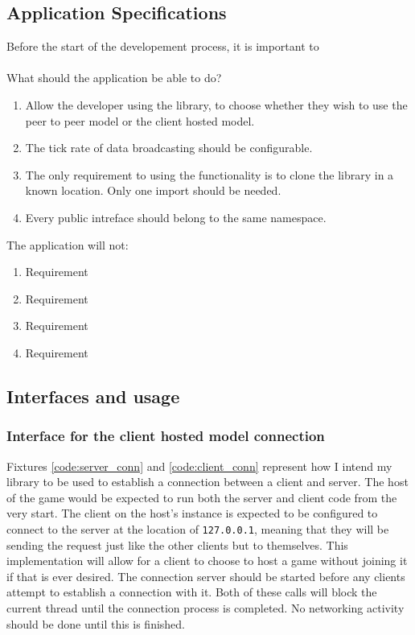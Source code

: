 \subsection{Application Specifications}
Before the start of the developement process, it is important to
\\
\\
What should the application be able to do?
\begin{enumerate}
\item Allow the developer using the library, to choose whether they wish to use the peer to peer model or the client hosted model.
\item The tick rate of data broadcasting should be configurable.
\item The only requirement to using the functionality is to clone the library in a known location. Only one import should be needed.
\item Every public intreface should belong to the same namespace.
\end{enumerate}
The application will not:
\begin{enumerate}
\item Requirement
\item Requirement
\item Requirement
\item Requirement
\end{enumerate}

\newpage
\subsection{Interfaces and usage}

\subsubsection{Interface for the client hosted model connection}
Fixtures \ref{code:server_conn} and \ref{code:client_conn} represent how I intend my library to be used to establish a connection between a client and server. The host of the game would be expected to run both the server and client code from the very start. The client on the host's instance is expected to be configured to connect to the server at the location of \lstinline{127.0.0.1}, meaning that they will be sending the request just like the other clients but to themselves. This implementation will allow for a client to choose to host a game without joining it if that is ever desired. The connection server should be started before any clients attempt to establish a connection with it. Both of these calls will block the current thread until the connection process is completed. No networking activity should be done until this is finished.

